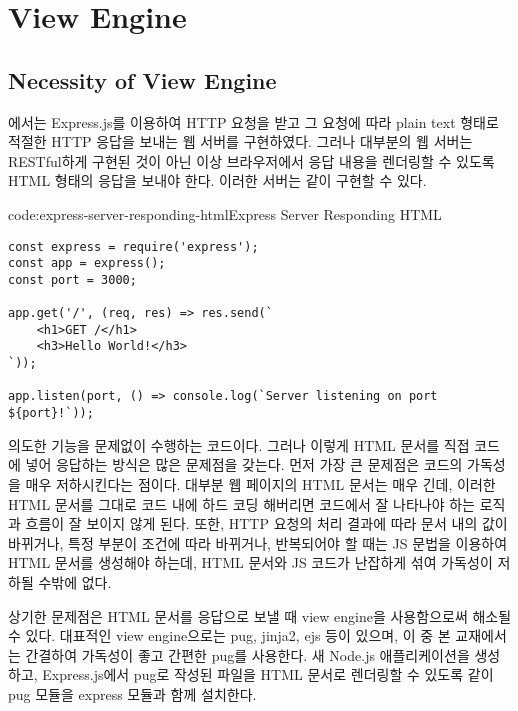 \section{View Engine}\label{sect:view-engine}

\subsection*{Necessity of View Engine}

에서는 Express.js를 이용하여 HTTP 요청을 받고 그 요청에 따라 plain text 형태로 적절한 HTTP 응답을 보내는 웹 서버를 구현하였다. 그러나 대부분의 웹 서버는 RESTful하게 구현된 것이 아닌 이상 브라우저에서 응답 내용을 렌더링할 수 있도록 HTML 형태의 응답을 보내야 한다. 이러한 서버는 \과 같이 구현할 수 있다.

\begin{codeenv}{code:express-server-responding-html}{Express Server Responding HTML}\begin{verbatim}
const express = require('express');
const app = express();
const port = 3000;

app.get('/', (req, res) => res.send(`
    <h1>GET /</h1>
    <h3>Hello World!</h3>
`));

app.listen(port, () => console.log(`Server listening on port ${port}!`));
\end{verbatim}
\end{codeenv}

\은 의도한 기능을 문제없이 수행하는 코드이다. 그러나 이렇게 HTML 문서를 직접 코드에 넣어 응답하는 방식은 많은 문제점을 갖는다. 먼저 가장 큰 문제점은 코드의 가독성을 매우 저하시킨다는 점이다. 대부분 웹 페이지의 HTML 문서는 매우 긴데, 이러한 HTML 문서를 그대로 코드 내에 하드 코딩 해버리면 코드에서 잘 나타나야 하는 로직과 흐름이 잘 보이지 않게 된다. 또한, HTTP 요청의 처리 결과에 따라 문서 내의 값이 바뀌거나, 특정 부분이 조건에 따라 바뀌거나, 반복되어야 할 때는 JS 문법을 이용하여 HTML 문서를 생성해야 하는데, HTML 문서와 JS 코드가 난잡하게 섞여 가독성이 저하될 수밖에 없다.

상기한 문제점은 HTML 문서를 응답으로 보낼 때 view engine을 사용함으로써 해소될 수 있다. 대표적인 view engine으로는 pug, jinja2, ejs 등이 있으며, 이 중 본 교재에서는 간결하여 가독성이 좋고 간편한 pug를 사용한다. 새 Node.js 애플리케이션을 생성하고, Express.js에서 pug로 작성된 파일을 HTML 문서로 렌더링할 수 있도록 \와 같이 pug 모듈을 express 모듈과 함께 설치한다.


